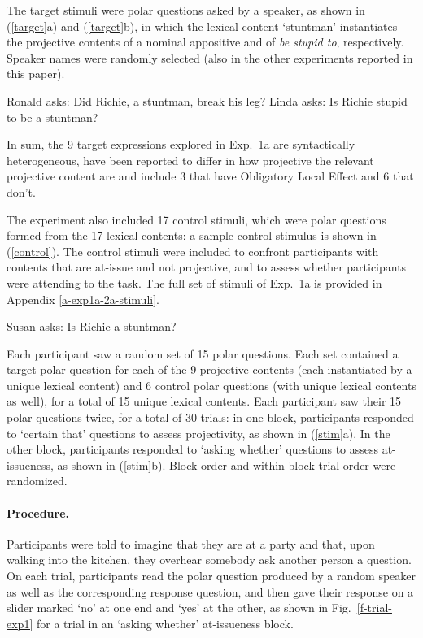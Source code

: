 \documentclass[11pt,fleqn]{article}
\newcommand{\6}{\mbox{$[\hspace*{-.6mm}[$}}
\newcommand{\9}{\mbox{$]\hspace*{-.6mm}]$}}
\newcommand{\figref}[1]{Fig.~\ref{#1}}
\begin{document}
The target stimuli were polar questions asked by a speaker, as shown in (\ref{target}a) and (\ref{target}b), in which the lexical content `stuntman' instantiates the projective contents of a nominal appositive and of {\em be stupid to}, respectively. Speaker names were randomly selected (also in the other experiments reported in this paper).

\begin{exe}
\ex\label{target}
\begin{xlist}
\ex Ronald asks: Did Richie, a stuntman, break his leg?
\ex Linda asks: Is Richie stupid to be a stuntman?
\end{xlist}
\end{exe}



In sum, the 9 target expressions explored in Exp.~1a are syntactically heterogeneous, have been reported to differ in how projective the relevant projective content are and include 3 that have Obligatory Local Effect and 6 that don't.

The experiment also included 17 control stimuli, which were polar questions formed from the 17 lexical contents: a sample control stimulus is shown in (\ref{control}). The control stimuli were included to confront participants with contents that are at-issue and not projective, and to assess whether participants were attending to the task. The full set of stimuli of Exp.~1a is provided in Appendix \ref{a-exp1a-2a-stimuli}.

\begin{exe}
\ex\label{control} Susan asks: Is Richie a stuntman?
\end{exe}


Each participant saw a random set of 15 polar questions. Each set contained a target polar question for each of the 9 projective contents (each instantiated by a unique lexical content) and 6 control polar questions (with unique lexical contents as well), for a total of 15 unique lexical contents. Each participant saw their 15 polar questions twice, for a total of 30 trials: in one block, participants responded to `certain that' questions to assess projectivity, as shown in (\ref{stim}a). In the other block, participants responded to `asking whether' questions to assess at-issueness, as shown in (\ref{stim}b). Block order and within-block trial order were randomized.



\paragraph{Procedure.} Participants were told to imagine that they are at a party and that, upon walking into the kitchen, they overhear somebody ask another person a question. On each trial, participants read the polar question produced by a random speaker as well as the corresponding response question, and then gave their response on a slider marked `no' at one end and `yes' at the other, as shown in \figref{f-trial-exp1} for a trial in an `asking whether' at-issueness block.  
\end{document}
